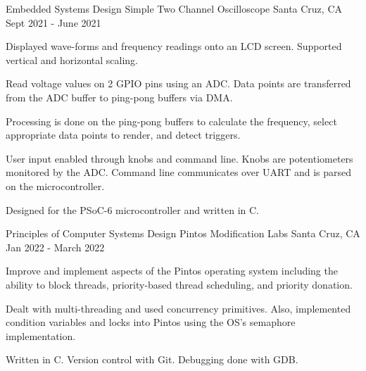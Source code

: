
\begin{cventries}
  \cventry
    {Embedded Systems Design} %
    {Simple Two Channel Oscilloscope} %
    {Santa Cruz, CA} %
    {Sept 2021 - June 2021} %
    {
      \begin{cvitems} %
        \item {Displayed wave-forms and frequency readings onto an LCD screen. Supported vertical and horizontal scaling.}
        \item {Read voltage values on 2 GPIO pins using an ADC. Data points are transferred from the ADC buffer to ping-pong buffers via DMA.}
        \item {Processing is done on the ping-pong buffers to calculate the frequency, select appropriate data points to render, and detect triggers.}
        \item {User input enabled through knobs and command line. Knobs are potentiometers monitored by the ADC. Command line communicates over UART and is parsed on the microcontroller.}
      	\item {Designed for the PSoC-6 microcontroller and written in C.}
      \end{cvitems}
    }

  \cventry
    {Principles of Computer Systems Design} %
    {Pintos Modification Labs} %
    {Santa Cruz, CA} %
    {Jan 2022 - March 2022} %
    {
      \begin{cvitems} %
        \item {Improve and implement aspects of the Pintos operating system including the ability to block threads, priority-based thread scheduling, and priority donation.}
        \item {Dealt with multi-threading and used concurrency primitives. Also, implemented condition variables and locks into Pintos using the OS's semaphore implementation.}
        \item {Written in C. Version control with Git. Debugging done with GDB.}
      \end{cvitems}
    }
    

\end{cventries}
